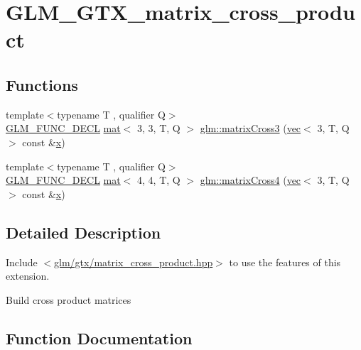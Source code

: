 \hypertarget{group__gtx__matrix__cross__product}{}\section{G\+L\+M\+\_\+\+G\+T\+X\+\_\+matrix\+\_\+cross\+\_\+product}
\label{group__gtx__matrix__cross__product}
\subsection*{Functions}
\begin{DoxyCompactItemize}
\item 
{\footnotesize template$<$typename T , qualifier Q$>$ }\\\hyperlink{setup_8hpp_ab2d052de21a70539923e9bcbf6e83a51}{G\+L\+M\+\_\+\+F\+U\+N\+C\+\_\+\+D\+E\+CL} \hyperlink{structglm_1_1mat}{mat}$<$ 3, 3, T, Q $>$ \hyperlink{group__gtx__matrix__cross__product_ga5802386bb4c37b3332a3b6fd8b6960ff}{glm\+::matrix\+Cross3} (\hyperlink{structglm_1_1vec}{vec}$<$ 3, T, Q $>$ const \&\hyperlink{_s_d_l__opengl_8h_ad0e63d0edcdbd3d79554076bf309fd47}{x})
\item 
{\footnotesize template$<$typename T , qualifier Q$>$ }\\\hyperlink{setup_8hpp_ab2d052de21a70539923e9bcbf6e83a51}{G\+L\+M\+\_\+\+F\+U\+N\+C\+\_\+\+D\+E\+CL} \hyperlink{structglm_1_1mat}{mat}$<$ 4, 4, T, Q $>$ \hyperlink{group__gtx__matrix__cross__product_ga20057fff91ddafa102934adb25458cde}{glm\+::matrix\+Cross4} (\hyperlink{structglm_1_1vec}{vec}$<$ 3, T, Q $>$ const \&\hyperlink{_s_d_l__opengl_8h_ad0e63d0edcdbd3d79554076bf309fd47}{x})
\end{DoxyCompactItemize}


\subsection{Detailed Description}
Include $<$\hyperlink{matrix__cross__product_8hpp}{glm/gtx/matrix\+\_\+cross\+\_\+product.\+hpp}$>$ to use the features of this extension.

Build cross product matrices 

\subsection{Function Documentation}
\mbox{\label{group__gtx__matrix__cross__product_ga5802386bb4c37b3332a3b6fd8b6960ff}} 
